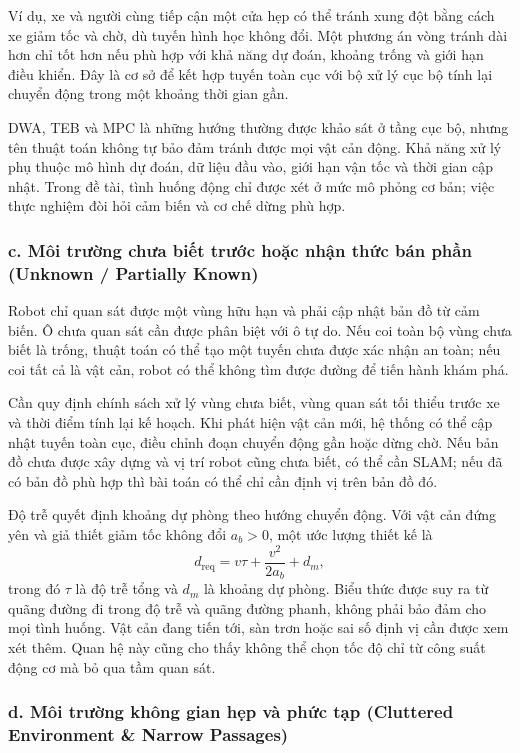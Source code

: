\documentclass[12pt,a4paper,oneside]{report}
\begin{document}
Ví dụ, xe và người cùng tiếp cận một cửa hẹp có thể tránh xung đột bằng cách xe giảm tốc và chờ, dù tuyến hình học không đổi. Một phương án vòng tránh dài hơn chỉ tốt hơn nếu phù hợp với khả năng dự đoán, khoảng trống và giới hạn điều khiển. Đây là cơ sở để kết hợp tuyến toàn cục với bộ xử lý cục bộ tính lại chuyển động trong một khoảng thời gian gần.

DWA, TEB và MPC là những hướng thường được khảo sát ở tầng cục bộ, nhưng tên thuật toán không tự bảo đảm tránh được mọi vật cản động. Khả năng xử lý phụ thuộc mô hình dự đoán, dữ liệu đầu vào, giới hạn vận tốc và thời gian cập nhật. Trong đề tài, tình huống động chỉ được xét ở mức mô phỏng cơ bản; việc thực nghiệm đòi hỏi cảm biến và cơ chế dừng phù hợp.

\subsubsection*{c. Môi trường chưa biết trước hoặc nhận thức bán phần (Unknown / Partially Known)}

Robot chỉ quan sát được một vùng hữu hạn và phải cập nhật bản đồ từ cảm biến. Ô chưa quan sát cần được phân biệt với ô tự do. Nếu coi toàn bộ vùng chưa biết là trống, thuật toán có thể tạo một tuyến chưa được xác nhận an toàn; nếu coi tất cả là vật cản, robot có thể không tìm được đường để tiến hành khám phá.

Cần quy định chính sách xử lý vùng chưa biết, vùng quan sát tối thiểu trước xe và thời điểm tính lại kế hoạch. Khi phát hiện vật cản mới, hệ thống có thể cập nhật tuyến toàn cục, điều chỉnh đoạn chuyển động gần hoặc dừng chờ. Nếu bản đồ chưa được xây dựng và vị trí robot cũng chưa biết, có thể cần SLAM; nếu đã có bản đồ phù hợp thì bài toán có thể chỉ cần định vị trên bản đồ đó.

Độ trễ quyết định khoảng dự phòng theo hướng chuyển động. Với vật cản đứng yên và giả thiết giảm tốc không đổi \(a_b>0\), một ước lượng thiết kế là
\[
  d_{\mathrm{req}}=v\tau+\frac{v^2}{2a_b}+d_m,
\]
trong đó \(\tau\) là độ trễ tổng và \(d_m\) là khoảng dự phòng. Biểu thức được suy ra từ quãng đường đi trong độ trễ và quãng đường phanh, không phải bảo đảm cho mọi tình huống. Vật cản đang tiến tới, sàn trơn hoặc sai số định vị cần được xem xét thêm. Quan hệ này cũng cho thấy không thể chọn tốc độ chỉ từ công suất động cơ mà bỏ qua tầm quan sát.

\subsubsection*{d. Môi trường không gian hẹp và phức tạp (Cluttered Environment \& Narrow Passages)}
\end{document}
